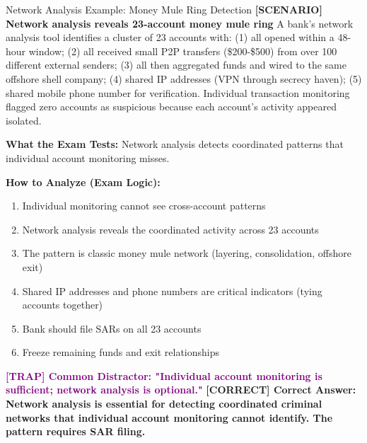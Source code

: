 \documentclass[11pt,a4paper]{beamer}
\newcommand{\trap}[1]{\textcolor{purple}{\textbf{[TRAP] #1}}}
\newcommand{\correct}[1]{\textcolor{green!50!black}{\textbf{[CORRECT] #1}}}
\newcommand{\scenario}[1]{\textcolor{blue!70!black}{\textbf{[SCENARIO] #1}}}
\begin{document}
\begin{frame}{Network Analysis Example: Money Mule Ring Detection}
	\scenario{Network analysis reveals 23-account money mule ring}
	A bank's network analysis tool identifies a cluster of 23 accounts with: (1) all opened within a 48-hour window; (2) all received small P2P transfers (\$200-\$500) from over 100 different external senders; (3) all then aggregated funds and wired to the same offshore shell company; (4) shared IP addresses (VPN through secrecy haven); (5) shared mobile phone number for verification. Individual transaction monitoring flagged zero accounts as suspicious because each account's activity appeared isolated.
	
	\vspace{0.1cm}
	\textbf{What the Exam Tests:} Network analysis detects coordinated patterns that individual account monitoring misses.
	
	\vspace{0.1cm}
	\textbf{How to Analyze (Exam Logic):}
	\begin{enumerate}
		\item Individual monitoring cannot see cross-account patterns
		\item Network analysis reveals the coordinated activity across 23 accounts
		\item The pattern is classic money mule network (layering, consolidation, offshore exit)
		\item Shared IP addresses and phone numbers are critical indicators (tying accounts together)
		\item Bank should file SARs on all 23 accounts
		\item Freeze remaining funds and exit relationships
	\end{enumerate}
	
	\trap{Common Distractor: "Individual account monitoring is sufficient; network analysis is optional."}
	\correct{Correct Answer: Network analysis is essential for detecting coordinated criminal networks that individual account monitoring cannot identify. The pattern requires SAR filing.}
\end{frame}
\end{document}
